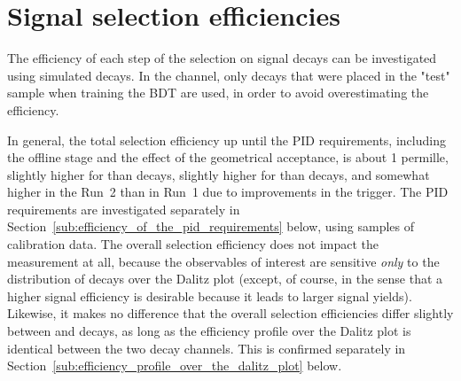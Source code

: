 

\section{Signal selection efficiencies} %
\label{sec:signal_selection_efficiencies}




The efficiency of each step of the selection on signal decays can be investigated using simulated decays. In the \BtoDpi channel, only decays that were placed in the "test" sample when training the BDT are used, in order to avoid overestimating the efficiency. 

In general, the total selection efficiency up until the PID requirements, including the offline stage and the effect of the geometrical \lhcb acceptance, is about 1 permille, slightly higher for \BtoDK than \BtoDpi decays, slightly higher for \DtoKsKK than \DtoKspipi decays, and somewhat higher in the Run~2 than in Run~1 due to improvements in the trigger. The PID requirements are investigated separately in Section~\ref{sub:efficiency_of_the_pid_requirements} below, using samples of calibration data. The overall selection efficiency does not impact the measurement at all, because the observables of interest are sensitive  \emph{only} to the distribution of decays over the Dalitz plot (except, of course, in the sense that a higher signal efficiency is desirable because it leads to larger signal yields). Likewise, it makes no difference that the overall selection efficiencies differ slightly between \BtoDK and \BtoDpi decays, as long as the efficiency profile over the Dalitz plot is identical between the two decay channels. This is confirmed separately in Section~\ref{sub:efficiency_profile_over_the_dalitz_plot} below.

